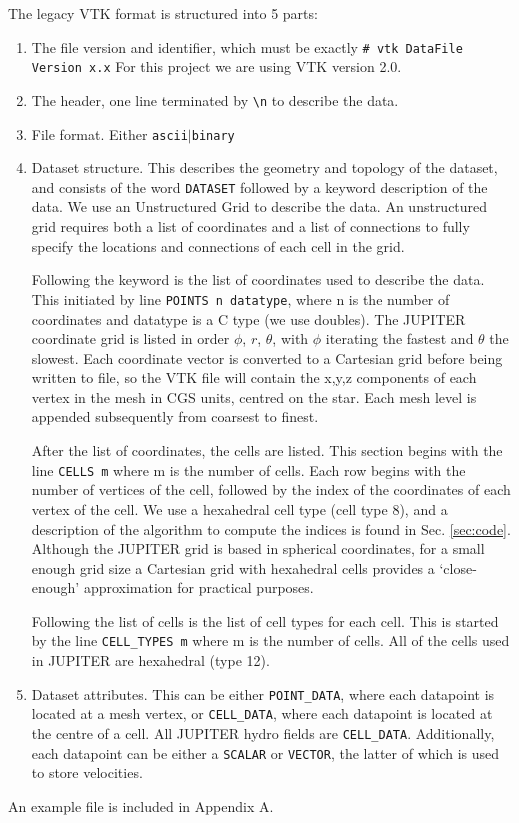 \documentclass[twocolumn]{aastex62}
\begin{document}
The legacy VTK format is structured into 5 parts:
\begin{enumerate}
	\item The file version and identifier, which must be exactly \verb|# vtk DataFile Version x.x|
	For this project we are using VTK version 2.0.
	\item The header, one line terminated by \verb|\n| to describe the data.
	\item File format. Either \verb|ascii|$\lvert$\verb|binary|
	\item Dataset structure. This describes the geometry and topology of the dataset, and consists of the word \verb|DATASET| followed by a keyword description of the data. We use an Unstructured Grid to describe the data.
	An unstructured grid requires both a list of coordinates and a list of connections to fully specify the locations and connections of each cell in the grid.
	
	Following the keyword is the list of coordinates used to describe the data. This initiated by line \verb|POINTS n datatype|, where n is the number of coordinates and datatype is a C type (we use doubles). The JUPITER coordinate grid is listed in order $\phi$, $r$, $\theta$, with $\phi$ iterating the fastest and $\theta$ the slowest. Each coordinate vector is converted to a Cartesian grid before being written to file, so the VTK file will contain the x,y,z components of each vertex in the mesh in CGS units, centred on the star. Each mesh level is appended subsequently from coarsest to finest. 
	
	After the list of coordinates, the cells are listed. This section begins with the line \verb|CELLS m| where m is the number of cells. Each row begins with the number of vertices of the cell, followed by the index of the coordinates of each vertex of the cell. We use a hexahedral cell type (cell type 8), and a description of the algorithm to compute the indices is found in Sec. \ref{sec:code}. Although the JUPITER grid is based in spherical coordinates, for a small enough grid size a Cartesian grid with hexahedral cells provides a `close-enough' approximation for practical purposes.
	
	Following the list of cells is the list of cell types for each cell. This is started by the line \verb|CELL_TYPES m| where m is the number of cells. All of the cells used in JUPITER are hexahedral (type 12).
	\item Dataset attributes. This can be either \verb|POINT_DATA|, where each datapoint is located at a mesh vertex, or \verb|CELL_DATA|, where each datapoint is located at the centre of a cell. All JUPITER hydro fields are \verb|CELL_DATA|. Additionally, each datapoint can be either a \verb|SCALAR| or \verb|VECTOR|, the latter of which is used to store velocities.
\end{enumerate}
An example file is included in Appendix A.
\end{document}

